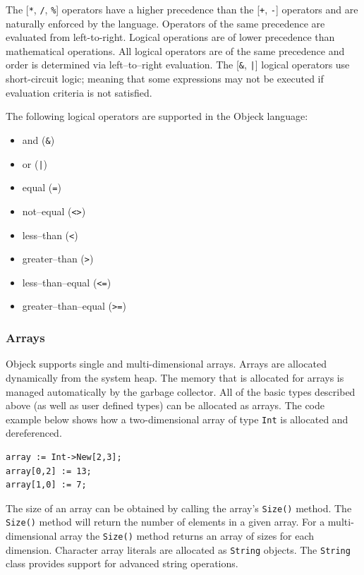 \documentclass[11pt]{article}
\begin{document}
The [\texttt{*}, \texttt{/}, \texttt{\%}] operators have a higher
precedence than the [\texttt{+}, \texttt{-}] operators and are
naturally enforced by the language. Operators of the same precedence
are evaluated from left-to-right.  Logical operations are of lower
precedence than mathematical operations. All logical operators are of
the same precedence and order is determined via left--to--right
evaluation.  The [\texttt{\&}, \texttt{|}] logical operators use
short-circuit logic; meaning that some expressions may not be executed
if evaluation criteria is not satisfied.

The following logical operators are supported in the Objeck language:
\begin{itemize}
\item and (\texttt{\&})
\item or (\texttt{|})
\item equal (\texttt{=})
\item not--equal (\texttt{<>})
\item less--than (\texttt{<})
\item greater--than (\texttt{>})
\item less--than--equal (\texttt{<=})
\item greater--than--equal (\texttt{>=})
\end{itemize}

\subsubsection{Arrays}
Objeck supports single and multi-dimensional arrays.  Arrays are
allocated dynamically from the system heap.  The memory that is
allocated for arrays is managed automatically by the garbage
collector.  All of the basic types described above (as well as user
defined types) can be allocated as arrays.  The code example below
shows how a two-dimensional array of type \texttt{Int} is allocated
and dereferenced.

\begin{verbatim}
array := Int->New[2,3];
array[0,2] := 13;
array[1,0] := 7;
\end{verbatim}

The size of an array can be obtained by calling the array's
\texttt{Size()} method.  The \texttt{Size()} method will return the
number of elements in a given array.  For a multi-dimensional array
the \texttt{Size()} method returns an array of sizes for each
dimension.  Character array literals are allocated as \texttt{String}
objects.  The \texttt{String} class provides support for advanced
string operations.
\end{document}
